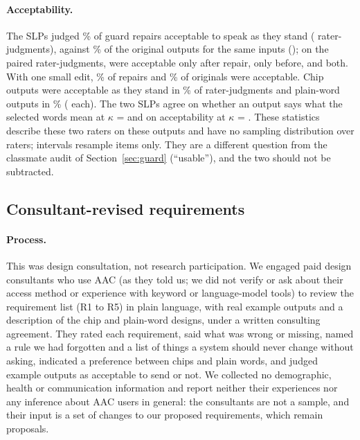 \paragraph{Acceptability.}
The SLPs judged \jmslpAccRepair{}\% of guard repairs acceptable to speak as they stand (\jmslpAccRepairN{} rater-judgments), against \jmslpAccOrig{}\% of the original outputs for the same inputs (\jmslpAccOrigN{}); on the \jmslpPairN{} paired rater-judgments, \jmslpPairRepOnlyK{} were acceptable only after repair, \jmslpPairOrigOnlyK{} only before, and \jmslpPairBothK{} both.
With one small edit, \jmslpRepairEdit{}\% of repairs and \jmslpOrigEdit{}\% of originals were acceptable.
Chip outputs were acceptable as they stand in \jmslpAccChip{}\% of rater-judgments and plain-word outputs in \jmslpAccWord{}\% (\jmslpAccChipN{} each).
The two SLPs agree on whether an output says what the selected words mean at $\kappa$ = \jmslpKappaA{} and on acceptability at $\kappa$ = \jmslpKappaB{}.
These statistics describe these two raters on these outputs and have no sampling distribution over raters; intervals resample items only.
They are a different question from the classmate audit of Section~\ref{sec:guard} (``usable''), and the two should not be subtracted.

\subsection{Consultant-revised requirements}\label{sec:req-revisions}

\paragraph{Process.}
This was design consultation, not research participation. We engaged \jmdesignConsultants{} paid design consultants who use AAC (as they told us; we did not verify or ask about their access method or experience with keyword or language-model tools) to review the requirement list (R1 to R5) in plain language, with real example outputs and a description of the chip and plain-word designs, under a written consulting agreement.
They rated each requirement, said what was wrong or missing, named a rule we had forgotten and a list of things a system should never change without asking, indicated a preference between chips and plain words, and judged \jmconsExN{} example outputs as acceptable to send or not.
We collected no demographic, health or communication information and report neither their experiences nor any inference about AAC users in general: the consultants are not a sample, and their input is a set of changes to our proposed requirements, which remain proposals.

